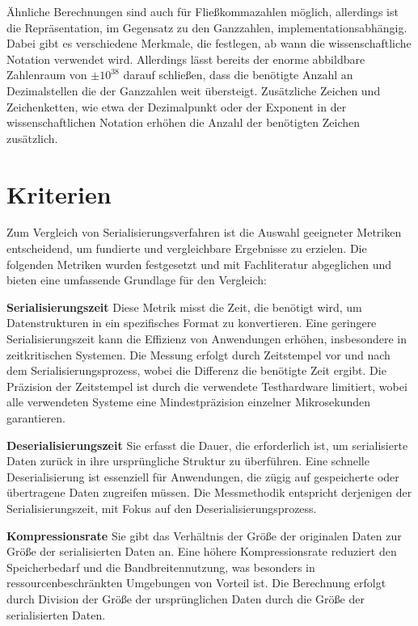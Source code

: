 \documentclass[ngerman]{seminarvorlage}
\begin{document}
Ähnliche Berechnungen sind auch für Fließkommazahlen möglich, allerdings ist die Repräsentation, im Gegensatz zu den Ganzzahlen, implementationsabhängig. Dabei gibt es verschiedene Merkmale, die festlegen, ab wann die wissenschaftliche Notation verwendet wird. Allerdings lässt bereits der enorme abbildbare Zahlenraum von $\pm10^{38}$ darauf schließen, dass die benötigte Anzahl an Dezimalstellen die der Ganzzahlen weit übersteigt. Zusätzliche Zeichen und Zeichenketten, wie etwa der Dezimalpunkt oder der Exponent in der wissenschaftlichen Notation erhöhen die Anzahl der benötigten Zeichen zusätzlich.

\section{Kriterien}

Zum Vergleich von Serialisierungsverfahren ist die Auswahl geeigneter Metriken entscheidend, um fundierte und vergleichbare Ergebnisse zu erzielen. Die folgenden Metriken wurden festgesetzt und mit Fachliteratur abgeglichen und bieten eine umfassende Grundlage für den Vergleich:

\textbf{Serialisierungszeit}\newline
Diese Metrik misst die Zeit, die benötigt wird, um Datenstrukturen in ein spezifisches Format zu konvertieren. Eine geringere Serialisierungszeit kann die Effizienz von Anwendungen erhöhen, insbesondere in zeitkritischen Systemen. Die Messung erfolgt durch Zeitstempel vor und nach dem Serialisierungsprozess, wobei die Differenz die benötigte Zeit ergibt. Die Präzision der Zeitstempel ist durch die verwendete Testhardware limitiert, wobei alle verwendeten Systeme eine Mindestpräzision einzelner Mikrosekunden garantieren.

\textbf{Deserialisierungszeit}\newline
Sie erfasst die Dauer, die erforderlich ist, um serialisierte Daten zurück in ihre ursprüngliche Struktur zu überführen. Eine schnelle Deserialisierung ist essenziell für Anwendungen, die zügig auf gespeicherte oder übertragene Daten zugreifen müssen. Die Messmethodik entspricht derjenigen der Serialisierungszeit, mit Fokus auf den Deserialisierungsprozess.

\textbf{Kompressionsrate}\newline
Sie gibt das Verhältnis der Größe der originalen Daten zur Größe der serialisierten Daten an. Eine höhere Kompressionsrate reduziert den Speicherbedarf und die Bandbreitennutzung, was besonders in ressourcenbeschränkten Umgebungen von Vorteil ist. Die Berechnung erfolgt durch Division der Größe der ursprünglichen Daten durch die Größe der serialisierten Daten.
\end{document}
